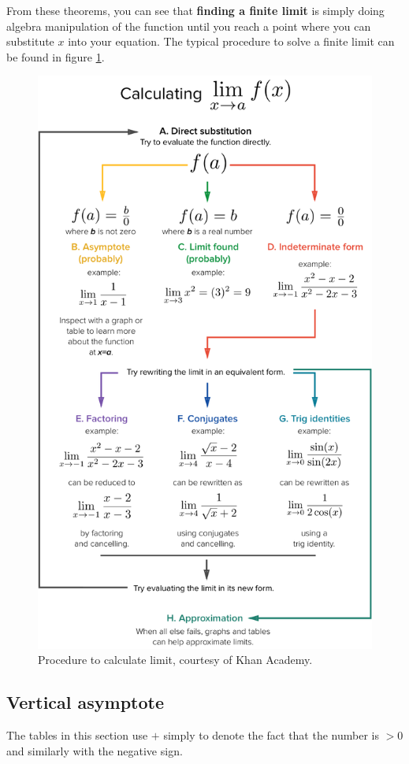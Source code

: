 From these theorems, you can see that \textbf{finding a finite limit} is simply doing algebra manipulation of the function until you reach a point where you can substitute $x$ into your equation. The typical procedure to solve a finite limit can be found in figure \ref{fig:m5}. 
\begin{figure}
    \centering
    \includegraphics[width=0.75\linewidth]{math/5.png}
    \caption{Procedure to calculate limit, courtesy of Khan Academy.}
    \label{fig:m5}
\end{figure}

\subsection{Vertical asymptote}
The tables in this section use $+$ simply to denote the fact that the number is $>0$ and similarly with the negative sign.

